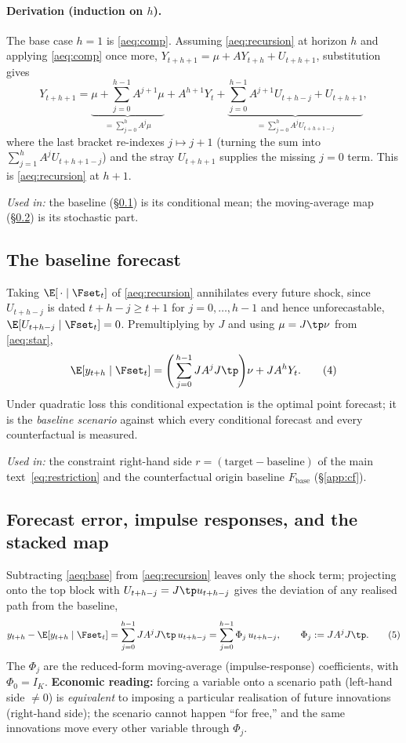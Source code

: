 \paragraph{Derivation (induction on $h$).} The base case $h=1$ is
\eqref{aeq:comp}. Assuming \eqref{aeq:recursion} at horizon $h$ and applying
\eqref{aeq:comp} once more, $Y_{t+h+1}=\mu+AY_{t+h}+U_{t+h+1}$, substitution gives
\[
Y_{t+h+1}
=\underbrace{\mu+\sum_{j=0}^{h-1}A^{j+1}\mu}_{=\sum_{j=0}^{h}A^{j}\mu}
+A^{h+1}Y_t
+\underbrace{\sum_{j=0}^{h-1}A^{j+1}U_{t+h-j}+U_{t+h+1}}_{=\sum_{j=0}^{h}A^{j}U_{t+h+1-j}},
\]
where the last bracket re-indexes $j\mapsto j+1$ (turning the sum into
$\sum_{j=1}^{h}A^{j}U_{t+h+1-j}$) and the stray $U_{t+h+1}$ supplies the missing
$j=0$ term. This is \eqref{aeq:recursion} at $h+1$.

\medskip
\noindent\textit{Used in:} the baseline (\S\ref{app:base}) is its conditional
mean; the moving-average map (\S\ref{app:ma}) is its stochastic part.

\subsection{The baseline forecast}\label{app:base}
Taking $\E[\,\cdot\mid\Fset_t]$ of \eqref{aeq:recursion} annihilates every future
shock, since $U_{t+h-j}$ is dated $t+h-j\ge t+1$ for $j=0,\dots,h-1$ and hence
unforecastable, $\E[U_{t+h-j}\mid\Fset_t]=0$. Premultiplying by $J$ and using
$\mu=J\tp\nu$ from \eqref{aeq:star},
\begin{equation}
\E[y_{t+h}\mid\Fset_t]
=\Bigg(\sum_{j=0}^{h-1}JA^{j}J\tp\Bigg)\nu+JA^{h}Y_t.
\tag{4}\label{aeq:base}
\end{equation}
Under quadratic loss this conditional expectation is the optimal point forecast;
it is the \emph{baseline scenario} against which every conditional forecast and
every counterfactual is measured.

\medskip
\noindent\textit{Used in:} the constraint right-hand side
$r=(\text{target}-\text{baseline})$ of the main text~\eqref{eq:restriction} and the counterfactual
origin baseline $F_{\text{base}}$ (\S\ref{app:cf}).

\subsection{Forecast error, impulse responses, and the stacked map}\label{app:ma}
Subtracting \eqref{aeq:base} from \eqref{aeq:recursion} leaves only the shock
term; projecting onto the top block with $U_{t+h-j}=J\tp u_{t+h-j}$ gives the
deviation of any realised path from the baseline,
\begin{equation}
y_{t+h}-\E[y_{t+h}\mid\Fset_t]
=\sum_{j=0}^{h-1}JA^{j}J\tp\,u_{t+h-j}
=\sum_{j=0}^{h-1}\Phi_j\,u_{t+h-j},
\qquad \Phi_j:=JA^{j}J\tp.
\tag{5}\label{aeq:dev}
\end{equation}
The $\Phi_j$ are the reduced-form moving-average (impulse-response) coefficients,
with $\Phi_0=I_K$. \textbf{Economic reading:} forcing a variable onto a scenario
path (left-hand side $\neq0$) is \emph{equivalent} to imposing a particular
realisation of future innovations (right-hand side); the scenario cannot happen
``for free,'' and the same innovations move every other variable through $\Phi_j$.

